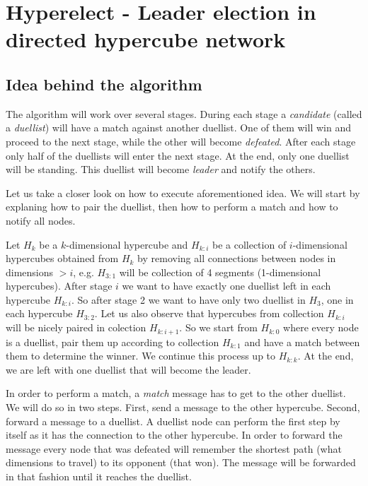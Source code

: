 \documentclass[11pt]{article}
\begin{document}
\section*{Hyperelect - Leader election in directed hypercube network}

\subsection*{Idea behind the algorithm}
The algorithm will work over several stages. During each stage a \textit{candidate} (called a \textit{duellist}) will have a match against another duellist. One of them will win and proceed to the next stage, while the other will become \textit{defeated}. After each stage only half of the duellists will enter the next stage. At the end, only one duellist will be standing. This duellist will become \textit{leader} and notify the others.

Let us take a closer look on how to execute aforementioned idea. We will start by explaning how to pair the duellist, then how to perform a match and how to notify all nodes. 

Let $H_{k}$ be a $k$-dimensional hypercube and $H_{k:i}$ be a collection of $i$-dimensional hypercubes obtained from $H_{k}$ by removing all connections between nodes in dimensions $>i$, e.g. $H_{3:1}$ will be collection of 4 segments (1-dimensional hypercubes). After stage $i$ we want to have exactly one duellist left in each hypercube $H_{k:i}$. So after stage 2 we want to have only two duellist in $H_{3}$, one in each hypercube $H_{3:2}$. Let us also observe that hypercubes from collection $H_{k:i}$ will be nicely paired in colection $H_{k:i+1}$. So we start from $H_{k:0}$ where every node is a duellist, pair them up according to collection $H_{k:1}$ and have a match between them to determine the winner. We continue this process up to $H_{k:k}$. At the end, we are left with one duellist that will become the leader.

In order to perform a match, a \textit{match} message has to get to the other duellist. We will do so in two steps. First, send a message to the other hypercube. Second, forward a message to a duellist. A duellist node can perform the first step by itself as it has the connection to the other hypercube. In order to forward the message every node that was defeated will remember the shortest path (what dimensions to travel) to its opponent (that won). The message will be forwarded in that fashion until it reaches the duellist.
\end{document}
